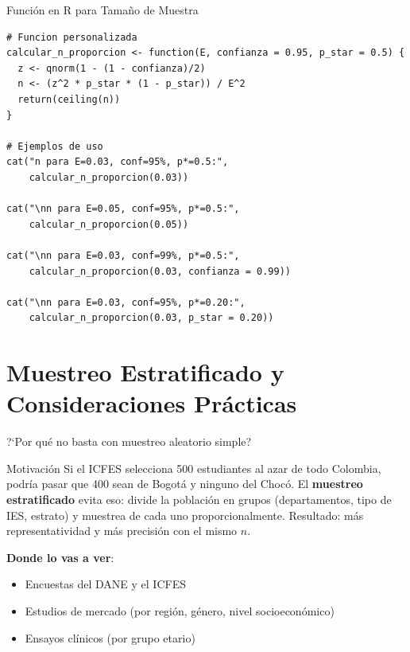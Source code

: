 \documentclass[aspectratio=169, 11pt]{beamer}
\begin{document}
\begin{frame}[fragile]{Función en R para Tamaño de Muestra}
\begin{lstlisting}[basicstyle=\ttfamily\scriptsize]
# Funcion personalizada
calcular_n_proporcion <- function(E, confianza = 0.95, p_star = 0.5) {
  z <- qnorm(1 - (1 - confianza)/2)
  n <- (z^2 * p_star * (1 - p_star)) / E^2
  return(ceiling(n))
}

# Ejemplos de uso
cat("n para E=0.03, conf=95%, p*=0.5:",
    calcular_n_proporcion(0.03))

cat("\nn para E=0.05, conf=95%, p*=0.5:",
    calcular_n_proporcion(0.05))

cat("\nn para E=0.03, conf=99%, p*=0.5:",
    calcular_n_proporcion(0.03, confianza = 0.99))

cat("\nn para E=0.03, conf=95%, p*=0.20:",
    calcular_n_proporcion(0.03, p_star = 0.20))
\end{lstlisting}
\end{frame}

\section{Muestreo Estratificado y Consideraciones Prácticas}

\begin{frame}{?`Por qu\'e no basta con muestreo aleatorio simple?}
\begin{exampleblock}{Motivaci\'on}
Si el ICFES selecciona 500 estudiantes al azar de todo Colombia, podr\'ia pasar que 400 sean de Bogot\'a y ninguno del Choc\'o. El \textbf{muestreo estratificado} evita eso: divide la poblaci\'on en grupos (departamentos, tipo de IES, estrato) y muestrea de cada uno proporcionalmente. Resultado: \alert{m\'as representatividad y m\'as precisi\'on} con el mismo $n$.
\end{exampleblock}

\textbf{Donde lo vas a ver}:
\begin{itemize}\setlength{\itemsep}{1pt}
  \item Encuestas del DANE y el ICFES
  \item Estudios de mercado (por regi\'on, g\'enero, nivel socioecon\'omico)
  \item Ensayos cl\'inicos (por grupo etario)
\end{itemize}
\end{frame}
\end{document}
